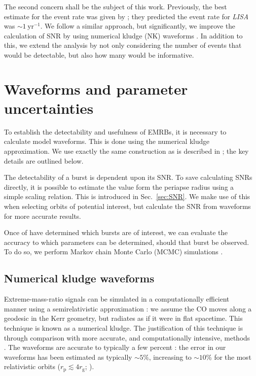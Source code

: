 \documentclass[useAMS,usedcolumn,usegraphicx,usenatbib]{mn2e}
\newcommand{\secref}[1]{Sec.~\ref{sec:#1}}
\newcommand{\units}[1]{\ensuremath{~\mathrm{#1}}}
\newcommand{\sub}[1]{\ensuremath{_\mathrm{#1}}}
\begin{document}
The second concern shall be the subject of this work. Previously, the best estimate for the event rate was given by \citet*{Hopman2007}; they predicted the event rate for \textit{LISA} was $\sim 1\units{yr^{-1}}$. We follow a similar approach, but significantly, we improve the calculation of SNR by using numerical kludge (NK) waveforms \citep{Babak2007}. In addition to this, we extend the analysis by not only considering the number of events that would be detectable, but also how many would be informative.

\section{Waveforms and parameter uncertainties}\label{sec:Waveforms}

To establish the detectability and usefulness of EMRBs, it is necessary to calculate model waveforms. This is done using the numerical kludge approximation. We use exactly the same construction as is described in \citet{Berry2012}; the key details are outlined below.

The detectability of a burst is dependent upon its SNR. To save calculating SNRs directly, it is possible to estimate the value form the periapse radius using a simple scaling relation. This is introduced in \secref{SNR}. We make use of this when selecting orbits of potential interest, but calculate the SNR from waveforms for more accurate results.

Once of have determined which bursts are of interest, we can evaluate the accuracy to which parameters can be determined, should that burst be observed. To do so, we perform Markov chain Monte Carlo (MCMC) simulations \citep[chapter 29]{MacKay2003}.

\subsection{Numerical kludge waveforms\label{sec:NK}}

Extreme-mass-ratio signals can be simulated in a computationally efficient manner using a semirelativistic approximation \citep{Ruffini1981}: we assume the CO moves along a geodesic in the Kerr geometry, but radiates as if it were in flat spacetime. This technique is known as a numerical kludge. The justification of this technique is through comparison with more accurate, and computationally intensive, methods \citep{Gair2005, Babak2007}. The waveforms are accurate to typically a few percent \citep{Tanaka1993,Gair2005}: the error in our waveforms has been estimated as typically $\sim 5\%$, increasing to $\sim 10\%$ for the most relativistic orbits ($r\sub{p} \lesssim 4 r\sub{g}$; \citealt{Berry2012}).
\end{document}
